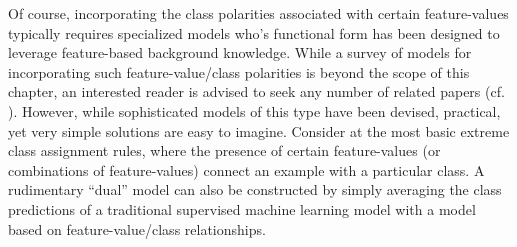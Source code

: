 Of course, incorporating the class polarities associated with certain feature-values typically requires specialized models who's functional form has been designed to leverage feature-based background knowledge. While a survey of models for incorporating such feature-value/class polarities is beyond the scope of this chapter, an interested reader is advised to seek any number of related papers (cf. \cite{melville:kdd09, schapire:icml02,wu:kdd04,liu:aaai04, dayanik:sigir06,kunapuli2010:knowledge, druck:sigir08}). However, while sophisticated models of this type have been devised, practical, yet very simple solutions are easy to imagine. Consider at the most basic extreme class assignment rules, where the presence of certain feature-values (or combinations of feature-values) connect an example with a particular class. A rudimentary ``dual'' model can also be constructed by simply averaging the class predictions of a traditional supervised machine learning model with a model based on feature-value/class relationships.

